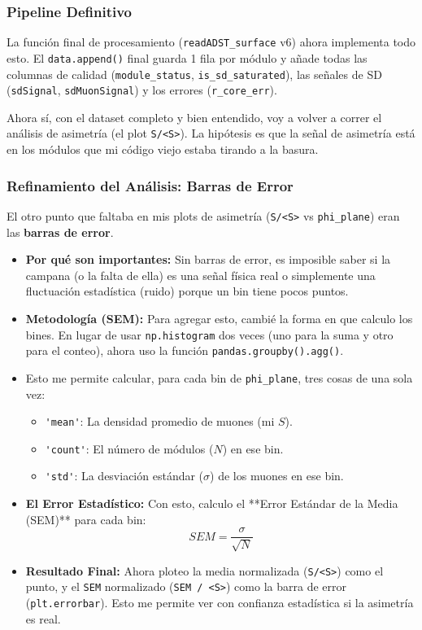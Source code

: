 \subsubsection*{Pipeline Definitivo}

La función final de procesamiento (\lstinline|readADST_surface| v6) ahora implementa todo esto. El \lstinline|data.append()| final guarda 1 fila por módulo y añade todas las columnas de calidad (\lstinline|module_status|, \lstinline|is_sd_saturated|), las señales de SD (\lstinline|sdSignal|, \lstinline|sdMuonSignal|) y los errores (\lstinline|r_core_err|).

Ahora sí, con el dataset completo y bien entendido, voy a volver a correr el análisis de asimetría (el plot \lstinline|S/<S>|). La hipótesis es que la señal de asimetría está en los módulos que mi código viejo estaba tirando a la basura.


\subsubsection*{Refinamiento del Análisis: Barras de Error}

El otro punto que faltaba en mis plots de asimetría (\lstinline|S/<S>| vs \lstinline|phi_plane|) eran las \textbf{barras de error}.

\begin{itemize}
	\item \textbf{Por qué son importantes:} Sin barras de error, es imposible saber si la campana (o la falta de ella) es una señal física real o simplemente una fluctuación estadística (ruido) porque un bin tiene pocos puntos.
	
	\item \textbf{Metodología (SEM):} Para agregar esto, cambié la forma en que calculo los bines. En lugar de usar \lstinline|np.histogram| dos veces (uno para la suma y otro para el conteo), ahora uso la función \lstinline|pandas.groupby().agg()|.
	
	\item Esto me permite calcular, para cada bin de \lstinline|phi_plane|, tres cosas de una sola vez:
	\begin{itemize}
		\item \lstinline|'mean'|: La densidad promedio de muones (mi $S$).
		\item \lstinline|'count'|: El número de módulos ($N$) en ese bin.
		\item \lstinline|'std'|: La desviación estándar ($\sigma$) de los muones en ese bin.
	\end{itemize}
	
	\item \textbf{El Error Estadístico:} Con esto, calculo el **Error Estándar de la Media (SEM)** para cada bin:
	$$ SEM = \frac{\sigma}{\sqrt{N}} $$
	
	\item \textbf{Resultado Final:} Ahora ploteo la media normalizada (\lstinline|S/<S>|) como el punto, y el \lstinline|SEM| normalizado (\lstinline|SEM / <S>|) como la barra de error (\lstinline|plt.errorbar|). Esto me permite ver con confianza estadística si la asimetría es real.
\end{itemize}

